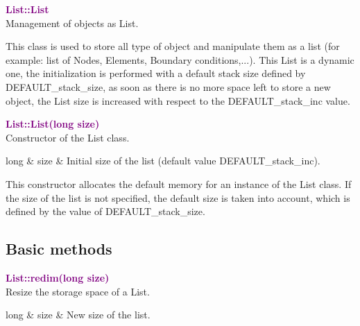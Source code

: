\textcolor{purple}{\textbf{List::List}}\label{List::List}\\
Management of objects as List.

This class is used to store all type of object and manipulate them as a list (for example: list of Nodes, Elements, Boundary conditions,...).
This List is a dynamic one, the initialization is performed with a default stack size defined by DEFAULT\_stack\_size, as soon as there is no more space left to store a new object,
the List size is increased with respect to the DEFAULT\_stack\_inc value.



\textcolor{purple}{\textbf{List::List(long size)}}\label{List::List(long size)}\\
Constructor of the List class.

\begin{tcolorbox}[width=\textwidth,myArgs,tabularx={ll|R}]
long & size & Initial size of the list (default value DEFAULT\_stack\_inc).
\end{tcolorbox}

This constructor allocates the default memory for an instance of the List class.
If the size of the list is not specified, the default size is taken into account, which is defined by the value of DEFAULT\_stack\_size.

\subsection{Basic methods}

\textcolor{purple}{\textbf{List::redim(long size)}}\label{List::redim(long size)}\\
Resize the storage space of a List.

\begin{tcolorbox}[width=\textwidth,myArgs,tabularx={ll|R}]
long & size & New size of the list.
\end{tcolorbox}


